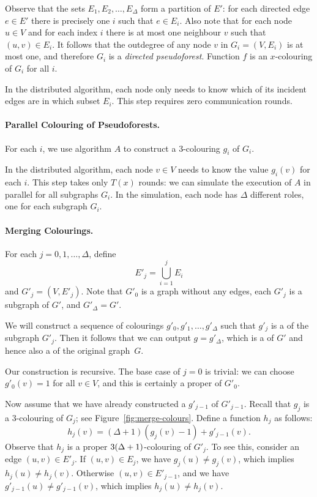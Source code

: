 Observe that the sets $E_1, E_2, \dotsc, E_\Delta$ form a partition of $E'$: for each directed edge $e \in E'$ there is precisely one $i$ such that $e \in E_i$. Also note that for each node $u \in V$ and for each index $i$ there is at most one neighbour $v$ such that $(u,v) \in E_i$. It follows that the outdegree of any node $v$ in $G_i = (V,E_i)$ is at most one, and therefore $G_i$ is a \emph{directed pseudoforest}. Function $f$ is an $x$-colouring of $G_i$ for all $i$.
    
In the distributed algorithm, each node only needs to know which of its incident edges are in which subset $E_i$. This step requires zero communication rounds.

\paragraph{Parallel Colouring of Pseudoforests.}

For each $i$, we use algorithm $A$ to construct a $3$-colouring $g_i$ of $G_i$.
    
In the distributed algorithm, each node $v \in V$ needs to know the value $g_i(v)$ for each $i$. This step takes only $T(x)$ rounds: we can simulate the execution of $A$ in parallel for all subgraphs $G_i$. In the simulation, each node has $\Delta$ different roles, one for each subgraph $G_i$.

\paragraph{Merging Colourings.}

For each $j = 0, 1, \dotsc, \Delta$, define
\[
    E'_j = \bigcup_{i = 1}^j E_i
\]
and $G'_j = (V,E'_j)$. Note that $G'_0$ is a graph without any edges, each $G'_j$ is a subgraph of $G'$, and $G'_\Delta = G'$.

We will construct a sequence of colourings $g'_0, g'_1, \dotsc, g'_\Delta$ such that $g'_j$ is a \Dpocol{} of the subgraph $G'_j$. Then it follows that we can output $g = g'_\Delta$, which is a \Dpocol{} of $G'$ and hence also a \Dpocol{} of the original graph~$G$.

Our construction is recursive. The base case of $j = 0$ is trivial: we can choose $g'_0(v) = 1$ for all $v \in V$, and this is certainly a proper \Dpocol{} of $G'_0$.

Now assume that we have already constructed a \Dpocol{} $g'_{j-1}$ of $G'_{j-1}$. Recall that $g_j$ is a $3$-colouring of $G_j$; see Figure~\ref{fig:merge-colours}. Define a function $h_j$ as follows:
\[
    h_j(v) = (\Delta+1) (g_j(v)-1) + g'_{j-1}(v).
\]
Observe that $h_j$ is a proper $3(\Delta+\nobreak 1)$-colouring of $G'_j$. To see this, consider an edge $(u,v) \in E'_j$. If $(u,v) \in E_j$, we have $g_j(u) \ne g_j(v)$, which implies $h_j(u) \ne h_j(v)$. Otherwise $(u,v) \in E'_{j-1}$, and we have $g'_{j-1}(u) \ne g'_{j-1}(v)$, which implies $h_j(u) \ne h_j(v)$.

